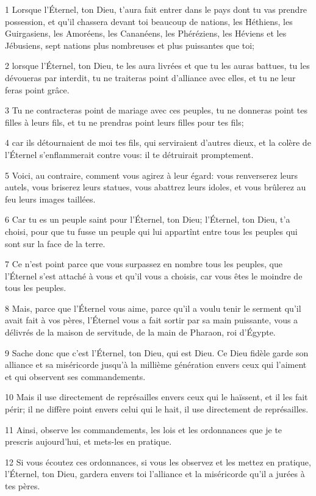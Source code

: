 \par 1 Lorsque l'Éternel, ton Dieu, t'aura fait entrer dans le pays dont tu vas prendre possession, et qu'il chassera devant toi beaucoup de nations, les Héthiens, les Guirgasiens, les Amoréens, les Cananéens, les Phéréziens, les Héviens et les Jébusiens, sept nations plus nombreuses et plus puissantes que toi;
\par 2 lorsque l'Éternel, ton Dieu, te les aura livrées et que tu les auras battues, tu les dévoueras par interdit, tu ne traiteras point d'alliance avec elles, et tu ne leur feras point grâce.
\par 3 Tu ne contracteras point de mariage avec ces peuples, tu ne donneras point tes filles à leurs fils, et tu ne prendras point leurs filles pour tes fils;
\par 4 car ils détournaient de moi tes fils, qui serviraient d'autres dieux, et la colère de l'Éternel s'enflammerait contre vous: il te détruirait promptement.
\par 5 Voici, au contraire, comment vous agirez à leur égard: vous renverserez leurs autels, vous briserez leurs statues, vous abattrez leurs idoles, et vous brûlerez au feu leurs images taillées.
\par 6 Car tu es un peuple saint pour l'Éternel, ton Dieu; l'Éternel, ton Dieu, t'a choisi, pour que tu fusse un peuple qui lui appartînt entre tous les peuples qui sont sur la face de la terre.
\par 7 Ce n'est point parce que vous surpassez en nombre tous les peuples, que l'Éternel s'est attaché à vous et qu'il vous a choisis, car vous êtes le moindre de tous les peuples.
\par 8 Mais, parce que l'Éternel vous aime, parce qu'il a voulu tenir le serment qu'il avait fait à vos pères, l'Éternel vous a fait sortir par sa main puissante, vous a délivrés de la maison de servitude, de la main de Pharaon, roi d'Égypte.
\par 9 Sache donc que c'est l'Éternel, ton Dieu, qui est Dieu. Ce Dieu fidèle garde son alliance et sa miséricorde jusqu'à la millième génération envers ceux qui l'aiment et qui observent ses commandements.
\par 10 Mais il use directement de représailles envers ceux qui le haïssent, et il les fait périr; il ne diffère point envers celui qui le hait, il use directement de représailles.
\par 11 Ainsi, observe les commandements, les lois et les ordonnances que je te prescris aujourd'hui, et mets-les en pratique.
\par 12 Si vous écoutez ces ordonnances, si vous les observez et les mettez en pratique, l'Éternel, ton Dieu, gardera envers toi l'alliance et la miséricorde qu'il a jurées à tes pères.
